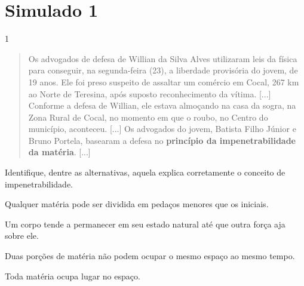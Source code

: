 \chapter{Simulado 1}

\num{1}
  \begin{quote}
  Os advogados de defesa de Willian da Silva Alves utilizaram leis da
  física para conseguir, na segunda-feira
  (23), a
  liberdade provisória do jovem, de 19 anos. Ele foi
  preso suspeito
  de assaltar um
  comércio em Cocal,
  267 km ao Norte
  de Teresina,
  após suposto reconhecimento da vítima. [...]
  Conforme a defesa de Willian,
  ele estava almoçando na casa da sogra, na Zona Rural de Cocal, no
  momento em que o roubo, no Centro do município, aconteceu. [...] Os
  advogados do jovem, Batista Filho Júnior e Bruno Portela, basearam a
  defesa no \textbf{princípio da impenetrabilidade da matéria}. [...]

\end{quote}

Identifique, dentre as alternativas, aquela explica corretamente o conceito de impenetrabilidade.

\begin{escolha}
\item
  Qualquer matéria pode ser dividida em pedaços menores que os iniciais.
\item
  Um corpo tende a permanecer em seu estado natural até que outra força aja sobre ele.
\item
  Duas porções de matéria não podem ocupar o mesmo espaço ao mesmo tempo.
\item
  Toda matéria ocupa lugar no espaço.
\end{escolha}


